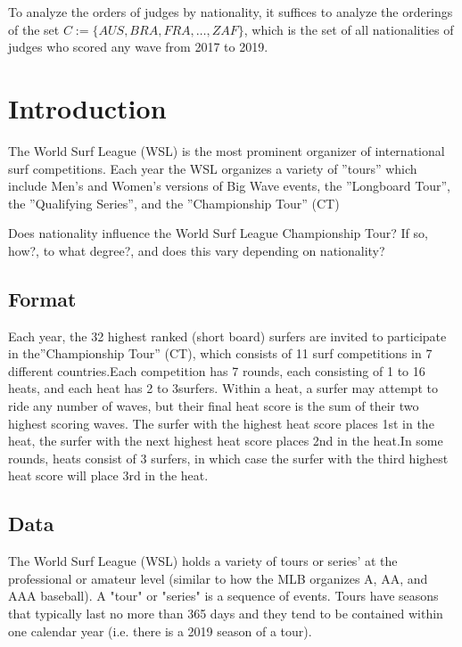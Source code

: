 \documentclass{article}
\theoremstyle{definition}
\begin{document}
To analyze the orders of judges by nationality, it suffices to analyze the orderings of the set $C := \{AUS, BRA, FRA, \dots, ZAF\}$, which is the set of all nationalities of judges who scored any wave from 2017 to 2019.

\section{Introduction}
The World Surf League (WSL) is the most prominent organizer of international surf competitions.  Each year the WSL organizes a variety of ”tours” which include Men's and Women's versions of Big Wave events, the ”Longboard Tour”, the ”Qualifying Series”, and the ”Championship Tour” (CT)

 Does nationality influence the World Surf League Championship Tour? If so, how?, to what degree?, and does this vary depending on nationality?

\subsection{Format}
Each  year,  the  32  highest  ranked  (short board)  surfers  are  invited  to  participate  in  the”Championship Tour” (CT), which consists of 11 surf competitions in 7 different countries.Each competition has 7 rounds, each consisting of 1 to 16 heats, and each heat has 2 to 3surfers.  Within a heat, a surfer may attempt to ride any number of waves, but their final heat score is the sum of their two highest scoring waves.  The surfer with the highest heat score places 1st in the heat, the surfer with the next highest heat score places 2nd in the heat.In some rounds, heats consist of 3 surfers, in which case the surfer with the third highest heat score will place 3rd in the heat.

\subsection{Data}
The World Surf League (WSL) holds a variety of tours or series' at the professional or amateur level (similar to how the MLB organizes A, AA, and AAA baseball). A "tour" or "series" is a sequence of events. Tours have seasons that typically last no more than 365 days and they tend to be contained within one calendar year (i.e. there is a 2019 season of a tour).
\end{document}
